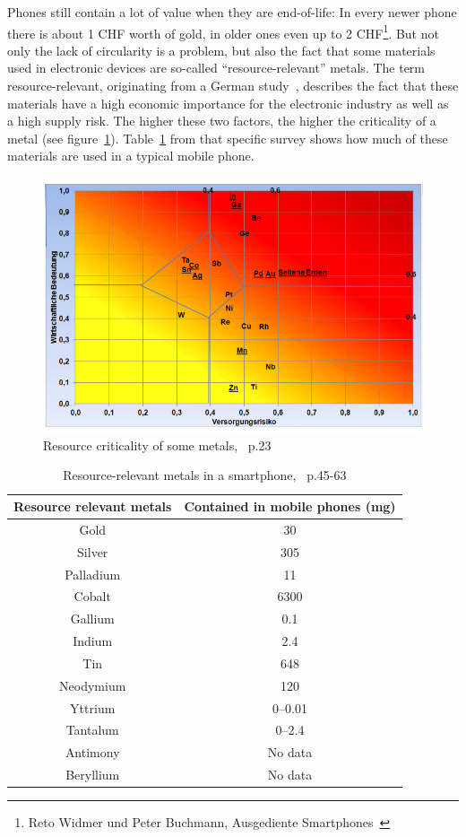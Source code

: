 \documentclass[11pt]{scrartcl}
\begin{document}
Phones still contain a lot of value when they are end-of-life: In every newer phone there is about 1 CHF worth of gold, in older ones even up to 2 CHF\footnote{Reto Widmer und Peter Buchmann, Ausgediente Smartphones~\cite{SRF}}. But not only the lack of circularity is a problem, but also the fact that some materials used in electronic devices are so-called ``resource-relevant'' metals. The term resource-relevant, originating from a German study~\cite{Studie}, describes the fact that these materials have a high economic importance for the electronic industry as well as a high supply risk. The higher these two factors, the higher the criticality of a metal (see figure~\ref{fig:crit}). Table~\ref{tbl:crit} from that specific survey shows how much of these materials are used in a typical mobile phone.

%
\begin{figure} [H]
    \includegraphics[width=\textwidth]{img/criticality}
    \caption{Resource criticality of some metals,~\cite{Studie} p.23}%
    \label{fig:crit}
\end{figure}
%
\begin{table} [H]
    \centering
    \begin{tabular}{c c}
        \toprule
        Resource relevant metals & Contained in mobile phones (mg) \\ \midrule
        Gold & 30 \\ \midrule
        Silver & 305 \\ \midrule
        Palladium & 11 \\ \midrule
        Cobalt	& 6300 \\ \midrule
        Gallium	& 0.1 \\ \midrule
        Indium	& 2.4 \\ \midrule
        Tin	& 648 \\ \midrule
        Neodymium & 120 \\ \midrule
        Yttrium	& 0--0.01 \\ \midrule
        Tantalum & 0--2.4 \\ \midrule
        Antimony & No data \\ \midrule
        Beryllium & No data \\ \bottomrule
    \end{tabular}
    \caption{Resource-relevant metals in a smartphone,~\cite{Studie} p.45-63}%
    \label{tbl:crit}
\end{table}
\end{document}
